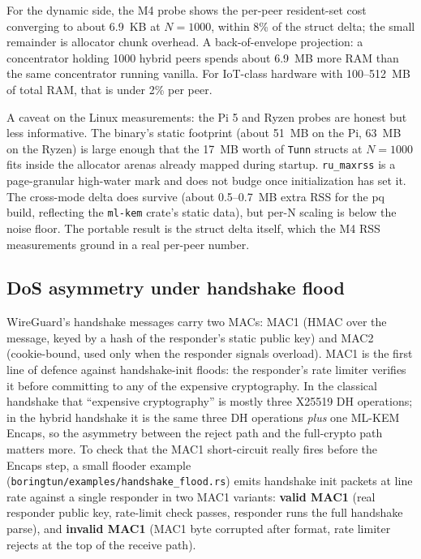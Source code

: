 \documentclass[11pt,a4paper]{article}
\begin{document}
For the dynamic side, the M4 probe shows the per-peer resident-set cost converging to about 6.9~KB at $N = 1000$, within 8\% of the struct delta; the small remainder is allocator chunk overhead. A back-of-envelope projection: a concentrator holding 1000 hybrid peers spends about 6.9~MB more RAM than the same concentrator running vanilla. For IoT-class hardware with 100--512~MB of total RAM, that is under 2\% per peer.

A caveat on the Linux measurements: the Pi 5 and Ryzen probes are honest but less informative. The binary's static footprint (about 51~MB on the Pi, 63~MB on the Ryzen) is large enough that the 17~MB worth of \texttt{Tunn} structs at $N = 1000$ fits inside the allocator arenas already mapped during startup. \texttt{ru\_maxrss} is a page-granular high-water mark and does not budge once initialization has set it. The cross-mode delta does survive (about 0.5--0.7~MB extra RSS for the pq build, reflecting the \texttt{ml-kem} crate's static data), but per-N scaling is below the noise floor. The portable result is the struct delta itself, which the M4 RSS measurements ground in a real per-peer number.

\subsection{DoS asymmetry under handshake flood}
\label{sec:eval_dos}

WireGuard's handshake messages carry two MACs: MAC1 (HMAC over the message, keyed by a hash of the responder's static public key) and MAC2 (cookie-bound, used only when the responder signals overload). MAC1 is the first line of defence against handshake-init floods: the responder's rate limiter verifies it before committing to any of the expensive cryptography. In the classical handshake that ``expensive cryptography'' is mostly three X25519 DH operations; in the hybrid handshake it is the same three DH operations \emph{plus} one ML-KEM Encaps, so the asymmetry between the reject path and the full-crypto path matters more. To check that the MAC1 short-circuit really fires before the Encaps step, a small flooder example (\texttt{boringtun/examples/handshake\_flood.rs}) emits handshake init packets at line rate against a single responder in two MAC1 variants: \textbf{valid MAC1} (real responder public key, rate-limit check passes, responder runs the full handshake parse), and \textbf{invalid MAC1} (MAC1 byte corrupted after format, rate limiter rejects at the top of the receive path).
\end{document}
